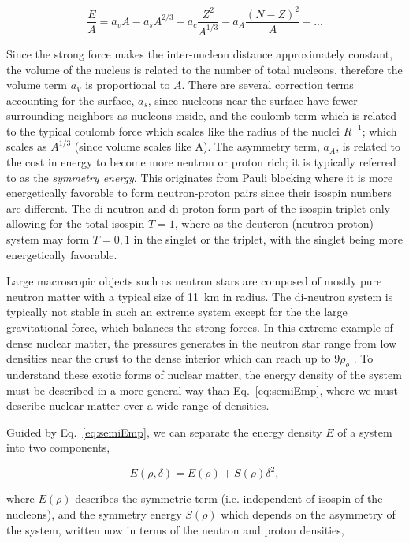 \begin{equation}
\frac{E}{A} = a_vA - a_s A^{2/3} - a_c \frac{Z^2}{A^{1/3}} - a_A\frac{(N - Z)^2}{A} + ...
\label{eq:semiEmp}
\end{equation}

Since the strong force makes the inter-nucleon distance approximately constant, the volume of the nucleus is related to the number of total nucleons, therefore the volume term $a_V$ is proportional to $A$. There are several correction terms accounting for the surface, $a_s$, since nucleons near the surface have fewer surrounding neighbors as nucleons inside, and the coulomb term which is related to the typical coulomb force which scales like the radius of the nuclei $R^{-1}$; which scales as $A^{1/3}$ (since volume scales like A). The asymmetry term, $a_A$, is related to the cost in energy to become more neutron or proton rich; it is typically referred to as the \emph{symmetry energy}. This originates from Pauli blocking where it is more energetically favorable to form neutron-proton pairs since their isospin numbers are different. The di-neutron and di-proton form part of the isospin triplet only allowing for the total isospin $T=1$, where as the deuteron (neutron-proton) system may form $T={0,1}$ in the singlet or the triplet, with the singlet being more energetically favorable. 

Large macroscopic objects such as neutron stars are composed of mostly pure neutron matter \cite{neutronstar} with a typical size of \SI{11}{\kilo\metre} in radius. The di-neutron system is typically not stable in such an extreme system except for the the large gravitational force, which balances the strong forces. In this extreme example of dense nuclear matter, the pressures generates in the neutron star range from low densities near the crust to the dense interior which can reach up to 9$\rho_o$ \cite{neutronstar}. To understand these exotic forms of nuclear matter, the energy density of the system must be described in a more general way than Eq.~\ref{eq:semiEmp}, where we must describe nuclear matter over a wide range of densities. 

Guided by Eq.~\ref{eq:semiEmp}, we can separate the energy density $E$ of a system into two components,

\begin{equation}
E(\rho,\delta) = E(\rho	) + S(\rho)\delta^2,
\label{eq:energyEos}
\end{equation}

where $E(\rho)$ describes the symmetric term (i.e. independent of isospin of the nucleons), and the symmetry energy $S(\rho)$ which depends on the asymmetry of the system, written now in terms of the neutron and proton densities, 

